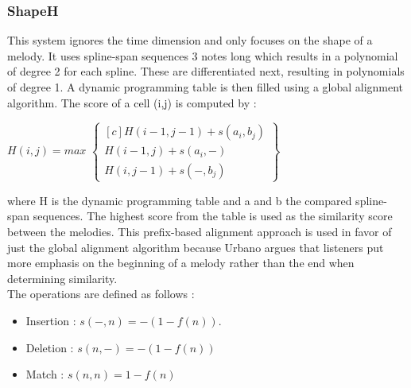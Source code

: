 \documentclass{llncs}
\begin{document}
\begin{itemize}
        \subsubsection{ShapeH}
        This system ignores the time dimension and only focuses on the shape of a melody. It uses spline-span sequences 3 notes long which results in a polynomial of degree 2 for each spline. These are differentiated next, resulting in polynomials of degree 1. 
        A dynamic programming table is then filled using a global alignment algorithm. The score of a cell (i,j) is computed by : \\
        \begin{center}
            $H(i,j) = max $
            $\begin{Bmatrix*}[c]
            H(i-1, j-1) + s(a_i, b_j) \\
            H(i-1,j) + s(a_i, -) \\
            H(i, j-1) + s(-,b_j)
            \end{Bmatrix*}$
        \end{center}
		where H is the dynamic programming table and a and b the compared spline-span sequences. The highest score from the table is used as the similarity score between the melodies. This prefix-based alignment approach is used in favor of just the global alignment algorithm because Urbano argues that listeners put more emphasis on the beginning of a melody rather than the end when determining similarity. \\
		The operations are defined as follows : 
		
		\begin{center}
            \begin{itemize}
             \item Insertion : 
            $ s(-,n) = -(1-f(n)).$
            \item Deletion : 
             $s(n,-) = -(1 - f(n))$
            \item Match : 
            $s(n,n) = 1-f(n)$
            \end{itemize}
        \end{center}
            

\end{itemize}
\end{document}
